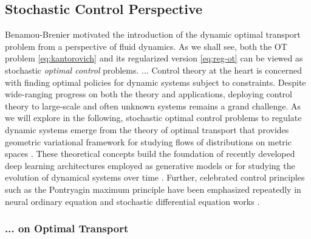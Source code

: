 \subsection{Stochastic Control Perspective} \label{sec:background_control}

Benamou-Brenier motivated the introduction of the dynamic optimal transport problem from a perspective of fluid dynamics.
As we shall see, both the OT problem \eqref{eq:kantorovich} and its regularized version \eqref{eq:reg-ot} can be viewed as stochastic \textit{optimal control} problems.
... %
Control theory at the heart is concerned with finding optimal policies for dynamic systems subject to constraints. Despite wide-ranging progress on both the theory and applications, deploying control theory to large-scale and often unknown systems remains a grand challenge.
As we will explore in the following, stochastic optimal control problems to regulate dynamic systems emerge from the theory of optimal transport \citep{santambrogio2015optimal} that provides geometric variational framework for studying flows of distributions on metric spaces \citep{chen2021optimal}.
These theoretical concepts build the foundation of recently developed deep learning architectures employed as generative models \citep{song2020score, de2021diffusion} or for studying the evolution of dynamical systems over time \citep{chen2021likelihood, bunne2022proximal, vargas2021solving}.
Further, celebrated control principles such as the Pontryagin maximum principle have been emphasized repeatedly in neural ordinary equation \citep{chen2018neural} and stochastic differential equation works \citep{jia2019neural}.

\subsubsection*{... on Optimal Transport} \label{sec:background_control_ot}

